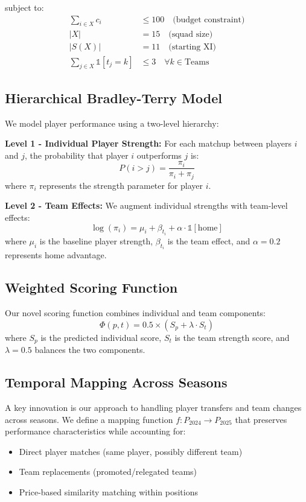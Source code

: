 \documentclass[12pt]{article}
\begin{document}
subject to:
\begin{align}
\sum_{i \in X} c_i &\leq 100 \quad \text{(budget constraint)}\\
|X| &= 15 \quad \text{(squad size)}\\
|S(X)| &= 11 \quad \text{(starting XI)}\\
\sum_{j \in X} \mathbb{1}[t_j = k] &\leq 3 \quad \forall k \in \text{Teams}
\end{align}

\subsection{Hierarchical Bradley-Terry Model}

We model player performance using a two-level hierarchy:

\textbf{Level 1 - Individual Player Strength:}
For each matchup between players $i$ and $j$, the probability that player $i$ outperforms $j$ is:
\begin{equation}
P(i > j) = \frac{\pi_i}{\pi_i + \pi_j}
\end{equation}
where $\pi_i$ represents the strength parameter for player $i$.

\textbf{Level 2 - Team Effects:}
We augment individual strengths with team-level effects:
\begin{equation}
\log(\pi_i) = \mu_i + \beta_{t_i} + \alpha \cdot \mathbb{1}[\text{home}]
\end{equation}
where $\mu_i$ is the baseline player strength, $\beta_{t_i}$ is the team effect, and $\alpha = 0.2$ represents home advantage.

\subsection{Weighted Scoring Function}

Our novel scoring function combines individual and team components:
\begin{equation}
\Phi(p,t) = 0.5 \times (S_p + \lambda \cdot S_t)
\end{equation}
where $S_p$ is the predicted individual score, $S_t$ is the team strength score, and $\lambda = 0.5$ balances the two components.

\subsection{Temporal Mapping Across Seasons}

A key innovation is our approach to handling player transfers and team changes across seasons. We define a mapping function $f: P_{2024} \rightarrow P_{2025}$ that preserves performance characteristics while accounting for:
\begin{itemize}
\item Direct player matches (same player, possibly different team)
\item Team replacements (promoted/relegated teams)
\item Price-based similarity matching within positions
\end{itemize}
\end{document}
